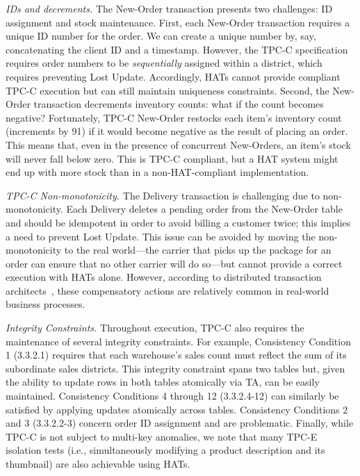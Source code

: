 \vspace{.5em}\noindent\textit{IDs and decrements.} The New-Order transaction presents two challenges: ID assignment and
stock maintenance. First, each New-Order transaction requires a unique
ID number for the order. We can create a unique number by, say,
concatenating the client ID and a timestamp. However, the TPC-C
specification requires order numbers to be \textit{sequentially}
assigned within a district, which requires preventing Lost
Update. Accordingly, HATs cannot provide compliant TPC-C execution but
can still maintain uniqueness constraints. Second, the New-Order
transaction decrements inventory counts: what if the count becomes
negative?  Fortunately, TPC-C New-Order restocks each item's inventory
count (increments by 91) if it would become negative as the result of
placing an order. This means that, even in the presence of concurrent
New-Orders, an item's stock will never fall below zero. This is TPC-C
compliant, but a HAT system might end up with more stock than in a
non-HAT-compliant implementation.

\vspace{.5em}\noindent\textit{TPC-C Non-monotonicity.} The Delivery
transaction is challenging due to non-monotonicity. Each Delivery
deletes a pending order from the New-Order table and should be
idempotent in order to avoid billing a customer twice; this implies a
need to prevent Lost Update. This issue can be avoided by moving the
non-monotonicity to the real world---the carrier that picks up the
package for an order can ensure that no other carrier will do so---but
cannot provide a correct execution with HATs alone. However, according
to distributed transaction architects~\cite{entitygroup}, these
compensatory actions are relatively common in real-world business
processes.

\vspace{.5em}\noindent\textit{Integrity Constraints.} Throughout execution, TPC-C also requires the maintenance of several
integrity constraints. For example, Consistency Condition 1 (3.3.2.1)
requires that each warehouse's sales count must reflect the sum of its
subordinate sales districts. This integrity constraint spans two
tables but, given the ability to update rows in both tables atomically
via TA, can be easily maintained. Consistency Conditions 4 through 12
(3.3.2.4-12) can similarly be satisfied by applying updates atomically
across tables. Consistency Conditions 2 and 3 (3.3.2.2-3) concern
order ID assignment and are problematic. Finally, while TPC-C is not
subject to multi-key anomalies, we note that many TPC-E isolation
tests (i.e., simultaneously modifying a product description and its
thumbnail) are also achievable using HATs.


